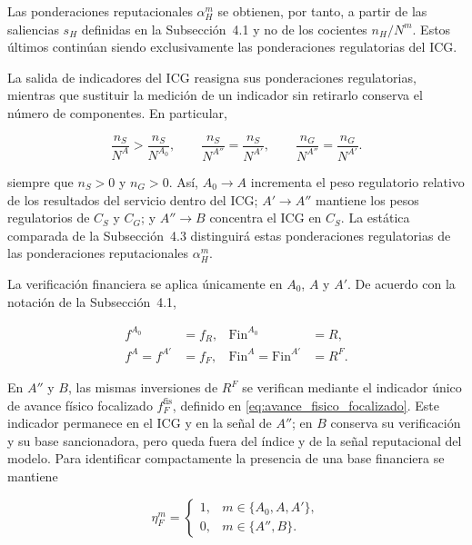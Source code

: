 Las ponderaciones reputacionales \(\alpha_H^m\) se obtienen, por tanto, a partir de las saliencias \(s_H\) definidas en la Subsección~4.1 y no de los cocientes \(n_H/N^m\). Estos últimos continúan siendo exclusivamente las ponderaciones regulatorias del ICG.

La salida de indicadores del ICG reasigna sus ponderaciones regulatorias, mientras que sustituir la medición de un indicador sin retirarlo conserva el número de componentes. En particular,

\begin{equation}
\label{eq:reasignacion_pesos_icg}
\frac{n_S}{N^{A}}
>
\frac{n_S}{N^{A_0}},
\qquad
\frac{n_S}{N^{A''}}
=
\frac{n_S}{N^{A'}},
\qquad
\frac{n_G}{N^{A''}}
=
\frac{n_G}{N^{A'}}.
\end{equation}

siempre que \(n_S>0\) y \(n_G>0\). Así, \(A_0\to A\) incrementa el peso regulatorio relativo de los resultados del servicio dentro del ICG; \(A'\to A''\) mantiene los pesos regulatorios de \(C_S\) y \(C_G\); y \(A''\to B\) concentra el ICG en \(C_S\). La estática comparada de la Subsección~4.3 distinguirá estas ponderaciones regulatorias de las ponderaciones reputacionales \(\alpha_H^m\).

La verificación financiera se aplica únicamente en \(A_0\), \(A\) y \(A'\). De acuerdo con la notación de la Subsección~4.1,

\begin{equation}
\label{eq:verificacion_financiera_esquemas}
\begin{aligned}
f^{A_0}&=f_R,
&
\mathrm{Fin}^{A_0}&=R,
\\
f^{A}=f^{A'}&=f_F,
&
\mathrm{Fin}^{A}=\mathrm{Fin}^{A'}&=R^{F}.
\end{aligned}
\end{equation}

En \(A''\) y \(B\), las mismas inversiones de \(R^{F}\) se verifican mediante el indicador único de avance físico focalizado \(f_F^{\mathrm{fis}}\), definido en \eqref{eq:avance_fisico_focalizado}. Este indicador permanece en el ICG y en la señal de \(A''\); en \(B\) conserva su verificación y su base sancionadora, pero queda fuera del índice y de la señal reputacional del modelo. Para identificar compactamente la presencia de una base financiera se mantiene

\begin{equation}
\label{eq:indicador_base_financiera}
\eta_F^m
=
\begin{cases}
1,
&
m\in\{A_0,A,A'\},
\\[4pt]
0,
&
m\in\{A'',B\}.
\end{cases}
\end{equation}

